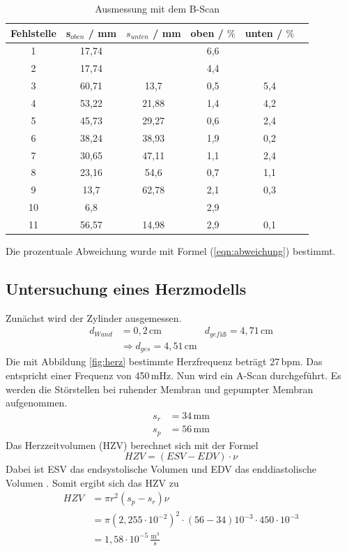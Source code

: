 \begin{table}
  \centering
  \caption{Ausmessung mit dem B-Scan}
  \label{tab:B}
  \begin{tabular}{c c c c c c}
    \toprule
     {Fehlstelle} & {s$_{oben}$ / mm} & {$s_{unten}$ / mm} &
    {oben / $\%$} & {unten / $\%$}\\
    \midrule
         1  & 17,74 &       & 6,6 &    \\
         2  & 17,74 &       & 4,4 &  \\
         3  & 60,71 & 13,7  & 0,5 & 5,4 \\
         4  & 53,22 & 21,88 & 1,4 & 4,2 \\
         5  & 45,73 & 29,27 & 0,6 & 2,4 \\
         6  & 38,24 & 38,93 & 1,9 & 0,2 \\
         7  & 30,65 & 47,11 & 1,1 & 2,4 \\
         8  & 23,16 & 54,6  & 0,7 & 1,1 \\
         9  & 13,7  & 62,78 & 2,1 & 0,3 \\
         10 & 6,8   &       & 2,9 &     \\
         11 & 56,57 & 14,98 & 2,9 & 0,1 \\
    \bottomrule
  \end{tabular}
\end{table}
Die prozentuale Abweichung wurde mit Formel (\ref{eqn:abweichung}) bestimmt.

\subsection{Untersuchung eines Herzmodells}
Zunächst wird der Zylinder ausgemessen.
\begin{align*}
  d_{Wand}&=0,2\,\mathrm{cm} & d_{gefäß}= 4,71\, \mathrm{cm}\\
  &\Rightarrow d_{ges}= 4,51\,\mathrm{cm}
\end{align*}
Die mit Abbildung \ref{fig:herz} bestimmte Herzfrequenz beträgt 27\,bpm.
Das entspricht einer Frequenz von 450\,mHz.
Nun wird ein A-Scan durchgeführt.
Es werden die Störstellen bei ruhender Membran und gepumpter Membran aufgenommen.
\begin{align*}
  s_{r} &= 34\,\mathrm{mm}\\
  s_{p} &= 56\,\mathrm{mm}
\end{align*}
Das Herzzeitvolumen (HZV) berechnet sich mit der Formel
\begin{equation}
  HZV = (ESV-EDV)\cdot \nu
\end{equation}
Dabei ist ESV das endsystolische Volumen und EDV das enddiastolische Volumen .
Somit ergibt sich das HZV zu
\begin{align*}
  HZV &= \pi r^2(s_p -s_r) \nu\\
      &= \pi (2,255\cdot10^{-2})^2\cdot(56-34)10^{-3}\cdot 450\cdot10^{-3}\\
      &= 1,58\cdot10^{-5}\,\mathrm{\frac{m^3}{s}}
\end{align*}

